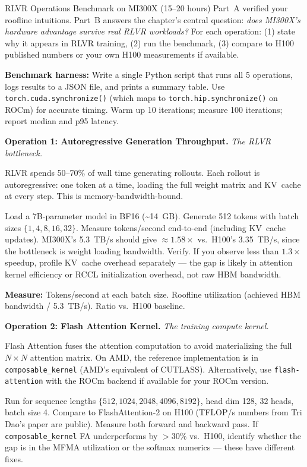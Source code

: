 \begin{exercise}{RLVR Operations Benchmark on MI300X (15--20 hours)}
Part~A verified your roofline intuitions. Part~B answers the chapter's central question: \textit{does MI300X's hardware advantage survive real RLVR workloads?} For each operation: (1) state why it appears in RLVR training, (2) run the benchmark, (3) compare to H100 published numbers or your own H100 measurements if available.

\textbf{Benchmark harness:} Write a single Python script that runs all 5 operations, logs results to a JSON file, and prints a summary table. Use \texttt{torch.cuda.synchronize()} (which maps to \texttt{torch.hip.synchronize()} on ROCm) for accurate timing. Warm up 10 iterations; measure 100 iterations; report median and p95 latency.

\medskip
\textbf{Operation 1: Autoregressive Generation Throughput.} \textit{The RLVR bottleneck.}

RLVR spends 50--70\% of wall time generating rollouts. Each rollout is autoregressive: one token at a time, loading the full weight matrix and KV~cache at every step. This is memory-bandwidth-bound.

Load a 7B-parameter model in BF16 (\textasciitilde{}14~GB). Generate 512 tokens with batch sizes $\{1, 4, 8, 16, 32\}$. Measure tokens/second end-to-end (including KV~cache updates). MI300X's 5.3~TB/s should give $\approx 1.58\times$ vs.\ H100's 3.35~TB/s, since the bottleneck is weight loading bandwidth. Verify. If you observe less than $1.3\times$ speedup, profile KV~cache overhead separately --- the gap is likely in attention kernel efficiency or RCCL initialization overhead, not raw HBM bandwidth.

\textbf{Measure:} Tokens/second at each batch size. Roofline utilization (achieved HBM bandwidth / 5.3~TB/s). Ratio vs.\ H100 baseline.

\medskip
\textbf{Operation 2: Flash Attention Kernel.} \textit{The training compute kernel.}

Flash Attention fuses the attention computation to avoid materializing the full $N \times N$ attention matrix. On AMD, the reference implementation is in \texttt{composable\_kernel} (AMD's equivalent of CUTLASS). Alternatively, use \texttt{flash-attention} with the ROCm backend if available for your ROCm version.

Run for sequence lengths $\{512, 1024, 2048, 4096, 8192\}$, head dim 128, 32 heads, batch size 4. Compare to FlashAttention-2 on H100 (TFLOP/s numbers from Tri Dao's paper are public). Measure both forward and backward pass. If \texttt{composable\_kernel} FA underperforms by $>30\%$ vs.\ H100, identify whether the gap is in the MFMA utilization or the softmax numerics --- these have different fixes.


\end{exercise}
